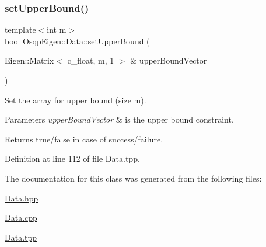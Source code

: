 \subsubsection{\texorpdfstring{set\+Upper\+Bound()}{setUpperBound()}}
{\footnotesize\ttfamily template$<$int m$>$ \\
bool Osqp\+Eigen\+::\+Data\+::set\+Upper\+Bound (\begin{DoxyParamCaption}\item[{Eigen\+::\+Matrix$<$ c\+\_\+float, m, 1 $>$ \&}]{upper\+Bound\+Vector }\end{DoxyParamCaption})}



Set the array for upper bound (size m). 


\begin{DoxyParams}{Parameters}
{\em upper\+Bound\+Vector} & is the upper bound constraint. \\
\hline
\end{DoxyParams}
\begin{DoxyReturn}{Returns}
true/false in case of success/failure. 
\end{DoxyReturn}


Definition at line 112 of file Data.\+tpp.



The documentation for this class was generated from the following files\+:\begin{DoxyCompactItemize}
\item 
\mbox{\hyperlink{Data_8hpp}{Data.\+hpp}}\item 
\mbox{\hyperlink{Data_8cpp}{Data.\+cpp}}\item 
\mbox{\hyperlink{Data_8tpp}{Data.\+tpp}}\end{DoxyCompactItemize}

